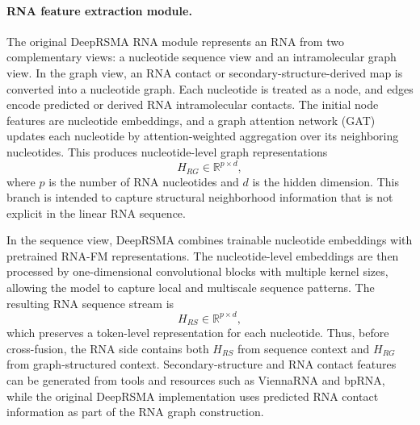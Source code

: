 \documentclass[journal=jcisd8,manuscript=article]{achemso}
\begin{document}
\paragraph{RNA feature extraction module.}
The original DeepRSMA RNA module represents an RNA from two complementary views: a nucleotide sequence view and an intramolecular graph view. In the graph view, an RNA contact or secondary-structure-derived map is converted into a nucleotide graph. Each nucleotide is treated as a node, and edges encode predicted or derived RNA intramolecular contacts. The initial node features are nucleotide embeddings, and a graph attention network (GAT) updates each nucleotide by attention-weighted aggregation over its neighboring nucleotides.\cite{Velickovic2017GAT} This produces nucleotide-level graph representations
\begin{equation}
H_{RG} \in \mathbb{R}^{p \times d},
\end{equation}
where $p$ is the number of RNA nucleotides and $d$ is the hidden dimension. This branch is intended to capture structural neighborhood information that is not explicit in the linear RNA sequence.

In the sequence view, DeepRSMA combines trainable nucleotide embeddings with pretrained RNA-FM representations.\cite{Chen2022RNAFM} The nucleotide-level embeddings are then processed by one-dimensional convolutional blocks with multiple kernel sizes, allowing the model to capture local and multiscale sequence patterns. The resulting RNA sequence stream is
\begin{equation}
H_{RS} \in \mathbb{R}^{p \times d},
\end{equation}
which preserves a token-level representation for each nucleotide. Thus, before cross-fusion, the RNA side contains both $H_{RS}$ from sequence context and $H_{RG}$ from graph-structured context. Secondary-structure and RNA contact features can be generated from tools and resources such as ViennaRNA and bpRNA, while the original DeepRSMA implementation uses predicted RNA contact information as part of the RNA graph construction.\cite{Lorenz2011ViennaRNA,Danaee2018bpRNA,Huang2024DeepRSMA}
\end{document}
